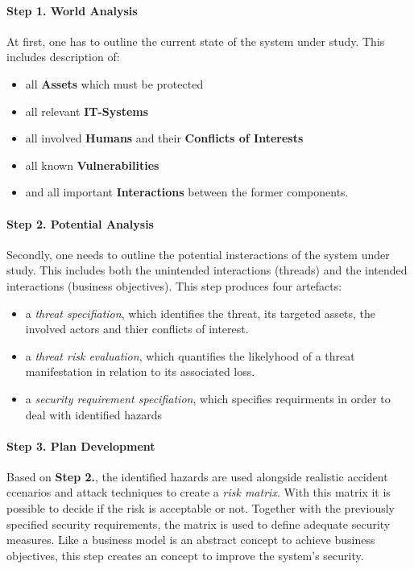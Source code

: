

\paragraph*{Step 1. World Analysis}

At first, one has to outline the current state of the system under study. This includes description of:

\begin{itemize}
\item all \textbf{Assets} which must be protected
\item all relevant \textbf{IT-Systems}
\item all involved \textbf{Humans} and their \textbf{Conflicts of Interests}
\item all known \textbf{Vulnerabilities}
\item and all important \textbf{Interactions} between the former components.
\end{itemize}

\paragraph*{Step 2. Potential Analysis}

Secondly, one needs to outline the potential insteractions of the system under study.
This includes both the unintended interactions (threads) and the intended interactions (business objectives).
This step produces four artefacts:
\begin{itemize}
\item a \emph{threat specifiation}, which identifies the threat, its targeted assets, the involved actors and thier conflicts of interest.
\item a \emph{threat risk evaluation}, which quantifies the likelyhood of a threat manifestation in relation to its associated loss.
\item a \emph{security requirement specifiation}, which specifies requirments in order to deal with identified hazards
\end{itemize}

\paragraph*{Step 3. Plan Development}

Based on \textbf{Step 2.}, the identified hazards are used alongside realistic accident ccenarios and attack techniques to create a \emph{risk matrix}.
With this matrix it is possible to decide if the risk is acceptable or not.
Together with the previously specified security requirements, the matrix is used to define adequate security measures.
Like a business model is an abstract concept to achieve business objectives, this step creates an concept to improve the system's security.

